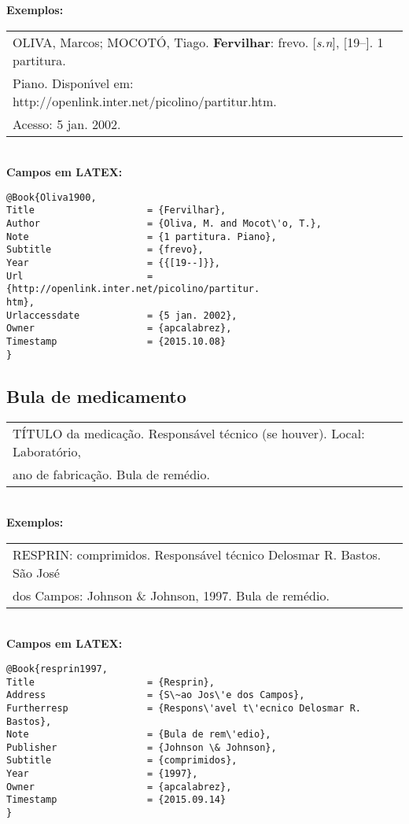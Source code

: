 \textbf{Exemplos:} \\

\begin{tabular}{|l|c|} \hline
	OLIVA, Marcos; MOCOT\'O, Tiago. \textbf{Fervilhar}: frevo. [\textit{s.n}], [19--]. 1 partitura.
	\\Piano. Dispon\'{\i}vel em: http://openlink.inter.net/picolino/partitur.htm.
	\\Acesso: 5 jan. 2002. 
	\\\hline
\end{tabular} \\

\textbf{Campos em LATEX:} 

\begin{verbatim}
@Book{Oliva1900,
Title                    = {Fervilhar},
Author                   = {Oliva, M. and Mocot\'o, T.},
Note                     = {1 partitura. Piano},
Subtitle                 = {frevo},
Year                     = {{[19--]}},
Url                      = {http://openlink.inter.net/picolino/partitur.
htm},
Urlaccessdate            = {5 jan. 2002},
Owner                    = {apcalabrez},
Timestamp                = {2015.10.08}
}
\end{verbatim}

\subsection{Bula de medicamento}

\begin{tabular}{|l|c|} \hline
	T\'ITULO da medica\c{c}\~ao. Respons\'avel t\'ecnico (se houver). Local: Laborat\'orio, \\ano de fabrica\c{c}\~ao. Bula de rem\'edio. 
	\\\hline
\end{tabular} \\

\textbf{Exemplos:} \\

\begin{tabular}{|l|c|} \hline
	RESPRIN: comprimidos. Respons\'avel t\'ecnico Delosmar R. Bastos. S\~ao Jos\'e \\dos Campos: Johnson \& Johnson, 1997. Bula de rem\'edio. 
	\\\hline
\end{tabular} \\

\textbf{Campos em LATEX:} 

\begin{verbatim}
@Book{resprin1997,
Title                    = {Resprin},
Address                  = {S\~ao Jos\'e dos Campos},
Furtherresp              = {Respons\'avel t\'ecnico Delosmar R. Bastos},
Note                     = {Bula de rem\'edio},
Publisher                = {Johnson \& Johnson},
Subtitle                 = {comprimidos},
Year                     = {1997},
Owner                    = {apcalabrez},
Timestamp                = {2015.09.14}
}
\end{verbatim}

